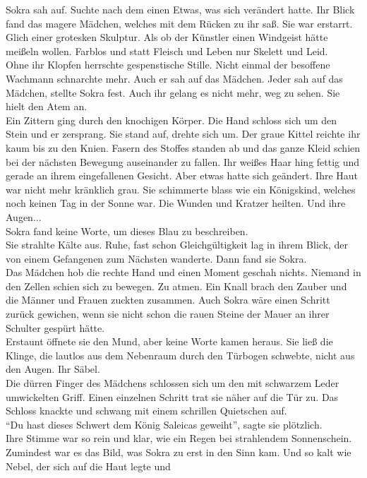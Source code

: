 Sokra sah auf. Suchte nach dem einen Etwas, was sich verändert hatte. Ihr Blick fand das magere 
Mädchen, welches mit dem Rücken zu ihr saß. Sie war erstarrt. Glich einer grotesken Skulptur. Als ob 
der Künstler einen Windgeist hätte meißeln wollen. Farblos und statt Fleisch und Leben nur Skelett 
und Leid.\\
Ohne ihr Klopfen herrschte gespenstische Stille. Nicht einmal der besoffene Wachmann schnarchte 
mehr. Auch er sah auf das Mädchen. Jeder sah auf das Mädchen, stellte Sokra fest. Auch ihr gelang 
es nicht mehr, weg zu sehen. Sie hielt den Atem an.\\
Ein Zittern ging durch den knochigen Körper. Die Hand schloss sich um den Stein und er zersprang. 
Sie stand auf, drehte sich um. Der graue Kittel reichte ihr kaum bis zu den Knien. Fasern des 
Stoffes standen ab und das ganze Kleid schien bei der nächsten Bewegung auseinander zu fallen. Ihr 
weißes Haar hing fettig und gerade an ihrem eingefallenen Gesicht. Aber etwas hatte sich geändert. 
Ihre Haut war nicht mehr kränklich grau. Sie schimmerte blass wie ein Königskind, welches noch 
keinen Tag in der Sonne war. Die Wunden und Kratzer heilten. Und ihre Augen...\\
Sokra fand keine Worte, um dieses Blau zu beschreiben.\\
Sie strahlte Kälte aus. Ruhe, fast schon Gleichgültigkeit lag in ihrem Blick, der von einem 
Gefangenen zum Nächsten wanderte. Dann fand sie Sokra.\\
Das Mädchen hob die rechte Hand und einen Moment geschah nichts. Niemand in den Zellen schien sich 
zu bewegen. Zu atmen. Ein Knall brach den Zauber und die Männer und Frauen zuckten zusammen. Auch 
Sokra wäre einen Schritt zurück gewichen, wenn sie nicht schon die rauen Steine der Mauer an ihrer 
Schulter gespürt hätte.\\
Erstaunt öffnete sie den Mund, aber keine Worte kamen heraus. Sie ließ die Klinge, die lautlos aus 
dem Nebenraum durch den Türbogen schwebte, nicht aus den Augen. Ihr Säbel.\\
Die dürren Finger des Mädchens schlossen sich um den mit schwarzem Leder umwickelten 
Griff. Einen einzelnen Schritt trat sie näher auf die Tür zu. Das Schloss knackte und schwang mit 
einem schrillen Quietschen auf.\\
``Du hast dieses Schwert dem König Saleicas geweiht'', sagte sie plötzlich.\\
Ihre Stimme war so rein und klar, wie ein Regen bei strahlendem Sonnenschein. Zumindest war es das 
Bild, was Sokra zu erst in den Sinn kam. Und so kalt wie Nebel, der sich auf die Haut legte und 
